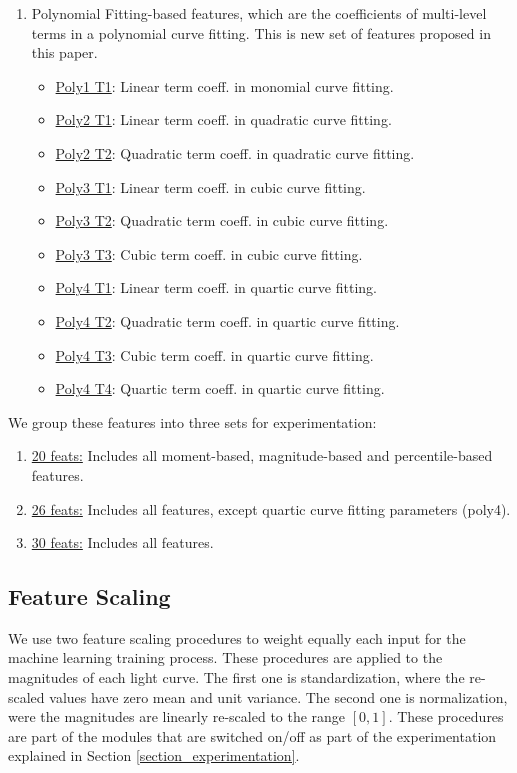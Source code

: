 \documentclass[a4paper,fleqn,usenatbib]{mnras}
\begin{document}
\begin{enumerate}
  \item Polynomial Fitting-based features, which are the coefficients of
    multi-level terms in a polynomial curve fitting. This is new set
    of features proposed in this paper. 
    \begin{itemize}
        \item \underline{Poly1 T1}: Linear term coeff. in monomial curve fitting.
        \item \underline{Poly2 T1}: Linear term coeff. in quadratic curve fitting.
        \item \underline{Poly2 T2}: Quadratic term coeff. in quadratic curve fitting.
        \item \underline{Poly3 T1}: Linear term coeff. in cubic curve fitting.
        \item \underline{Poly3 T2}: Quadratic term coeff. in cubic curve fitting.
        \item \underline{Poly3 T3}: Cubic term coeff. in cubic curve fitting.
        \item \underline{Poly4 T1}: Linear term coeff. in quartic curve fitting.
        \item \underline{Poly4 T2}: Quadratic term coeff. in quartic curve fitting.
        \item \underline{Poly4 T3}: Cubic term coeff. in quartic curve fitting.
        \item \underline{Poly4 T4}: Quartic term coeff. in quartic curve fitting.
    \end{itemize}    
\end{enumerate}

We group these features into three sets for experimentation:

\begin{enumerate}
\item \underline{20 feats:} Includes all moment-based, magnitude-based
  and percentile-based features.  
\item \underline{26 feats:} Includes all features, except quartic
  curve fitting parameters (poly4). 
\item \underline{30 feats:} Includes all features.
\end{enumerate}


\subsection{Feature Scaling} \label{subsection_scaling}

We use two feature scaling procedures to weight equally each input
for the machine learning training process.
These procedures are applied to the magnitudes of each light curve.
The first one is standardization, where the re-scaled values have zero mean 
and unit variance. 
The second one is normalization, were the magnitudes are linearly re-scaled  to the
range $[0,1]$. 
These procedures are part of the modules that are switched on/off as
part of the experimentation explained in Section \ref{section_experimentation}.
\end{document}

